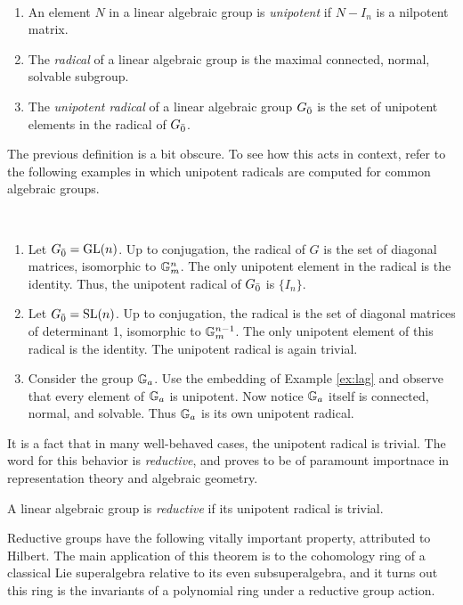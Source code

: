 \begin{definition}~
  \begin{enumerate}
  \item An element $N$ in a linear algebraic group is \emph{unipotent} if $N- I_n$ is a nilpotent matrix.
  \item The \emph{radical} of a linear algebraic group is the maximal connected, normal, solvable subgroup.
  \item The \emph{unipotent radical} of a linear algebraic group ${G}_{\bar{0}}$ is the set of unipotent elements in the radical of ${G}_{\bar{0}}$.
  \end{enumerate}
\end{definition}
The previous definition is a bit obscure. To see how this acts in context, refer to the following examples in which unipotent radicals are computed for common algebraic groups.
\filbreak
\begin{example}~
  \begin{enumerate}
  \item Let ${G}_{\bar{0}} = \operatorname{GL}(n)$. Up to conjugation, the radical of $G$ is the set of diagonal matrices, isomorphic to $\mathbb{G}_m^n$. The only unipotent element in the radical is the identity. Thus, the unipotent radical of ${G}_{\bar{0}}$ is $\{I_n\}$.
  \item Let ${G}_{\bar{0}} = \operatorname{SL}(n)$. Up to conjugation, the radical is the set of diagonal matrices of determinant 1, isomorphic to $\mathbb{G}_m^{n-1}$. The only unipotent element of this radical is the identity. The unipotent radical is again trivial.
  \item Consider the group $\mathbb{G}_a$. Use the embedding of Example \ref{ex:lag} and observe that every element of $\mathbb{G}_a$ is unipotent. Now notice $\mathbb{G}_a$ itself is connected, normal, and solvable. Thus $\mathbb{G}_a$ is its own unipotent radical.
  \end{enumerate}
\end{example}

It is a fact that in many well-behaved cases, the unipotent radical is trivial. The word for this behavior is \emph{reductive}, and proves to be of paramount importnace in representation theory and algebraic geometry.

\begin{definition}
  A linear algebraic group is \emph{reductive} if its unipotent radical is trivial. 
\end{definition}

Reductive groups have the following vitally important property, attributed to Hilbert. The main application of this theorem is to the cohomology ring of a classical Lie superalgebra relative to its even subsuperalgebra, and it turns out this ring is the invariants of a polynomial ring under a reductive group action.

